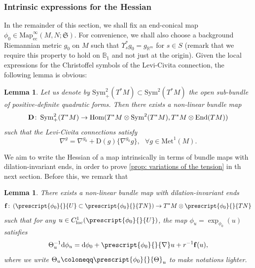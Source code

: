 \documentclass{article}
\numberwithin{equation}{section}        %
\theoremstyle{bfnote}
\newtheorem{lem}[thm]{Lemma}                %
\theoremstyle{definition}
\theoremstyle{bfremark}
\newcommand{\col}{\colon \thinspace}        %
\newcommand{\R}{\mathbb{R}}                 %
\newcommand{\Ball}{\mathbb{B}}              %
\newcommand{\Map}{\mathrm{Map}}             %
\newcommand{\Met}{\mathrm{Met}}             %
\newcommand{\diff}{\mathrm{d}}                      %
\newcommand{\bmap}[1]{\boldsymbol{\mathrm{#1}}}     %
\DeclareMathOperator{\Hom}{Hom}                 %
\DeclareMathOperator{\End}{End}                 %
\begin{document}
    \subsubsection{Intrinsic expressions for the Hessian}       \label{subsubsec: expressions hessian}

In the remainder of this section, we shall fix an end-conical map $\phi_0 \in \Map^\infty_{\mathrm{ec}}(M,N;\mathfrak{S})$. For convenience, we shall also choose a background Riemannian metric $g_0$ on $M$ such that $\Upsilon^*_s g_0 = g_{\R^m}$ for $s \in S$ (remark that we require this property to hold on $\Ball_1$ and not just at the origin). Given the local expressions for the Christoffel symbols of the Levi-Civita connection, the following lemma is obvious:

\begin{lem}     \label{lem: Bundle map LC}
    Let us denote by $\mathrm{Sym}^2_+(T^*M) \subset \mathrm{Sym}^2(T^*M)$ the open sub-bundle of positive-definite quadratic forms. Then there exists a non-linear bundle map
    \begin{equation*}
        \bmap{D} \col \mathrm{Sym}_+^2(T^*M) \to \Hom(T^*M \otimes \mathrm{Sym}^2(T^*M) , T^* M \otimes \End(TM))
    \end{equation*}
    such that the Levi-Civita connections satisfy
    \begin{equation*}
        \nabla^{g} = \nabla^{g_0} + \bmap{D}(g)\{\nabla^{g_0} g\}, ~~~ \forall g \in \Met^1(M) .
    \end{equation*}
\end{lem}

We aim to write the Hessian of a map intrinsically in terms of bundle maps with dilation-invariant ends, in order to prove  \cref{prop: variations of the tension} in th next section. Before this, we remark that

\begin{lem}     \label{lem: Bundle map diff exp}
    There exists a non-linear bundle map with dilation-invariant ends
    \begin{equation*}
        \bmap{f} \col (\prescript{\phi_0}{}{U} \subset \prescript{\phi_0}{}{TN}) \to T^*M \otimes \prescript{\phi_0}{}{TN}
    \end{equation*}
    such that for any $u \in C^1_{\mathrm{loc}}(\prescript{\phi_0}{}{U})$, the map $\phi_u = \exp_{\phi_0}(u)$ satisfies
    \begin{equation*}
        \Theta_u^{-1} \diff \phi_u = \diff \phi_0 + \prescript{\phi_0}{}{\nabla} u + r^{-1} \bmap{f}(u),
    \end{equation*}
    where we write $\Theta_u \coloneqq \prescript{\phi_0}{}{\Theta}_u$ to make notations lighter.
\end{lem}
\end{document}
